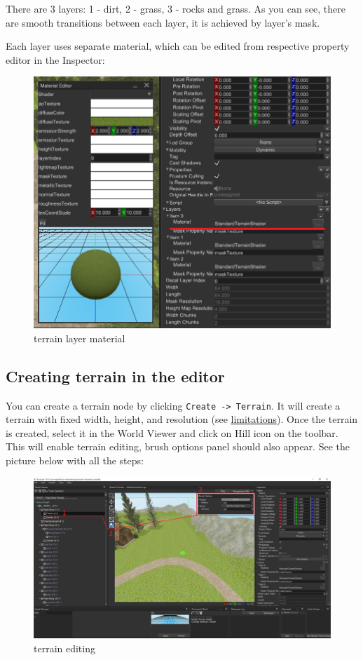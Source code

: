 \documentclass[
]{book}
\theoremstyle{definition}
\theoremstyle{definition}
\theoremstyle{definition}
\theoremstyle{definition}
\theoremstyle{remark}
\begin{document}
There are 3 layers: 1 - dirt, 2 - grass, 3 - rocks and grass. As you can see, there are smooth transitions between each layer, it is achieved by layer's mask.

Each layer uses separate material, which can be edited from respective property editor in the Inspector:

\begin{figure}
\centering
\includegraphics{images/scene_terrain_layer_material.png}
\caption{terrain layer material}
\end{figure}

\subsection{Creating terrain in the editor}\label{creating-terrain-in-the-editor}

You can create a terrain node by clicking \texttt{Create\ -\textgreater{}\ Terrain}. It will create a terrain with fixed width, height, and resolution (see \href{./terrain_node.md\#limitations-and-known-issues}{limitations}). Once the terrain is created, select it in the World Viewer and click on Hill icon on the toolbar. This will enable terrain editing, brush options panel should also appear. See the picture below with all the steps:

\begin{figure}
\centering
\includegraphics{images/scene_terrain_editing.png}
\caption{terrain editing}
\end{figure}
\end{document}
